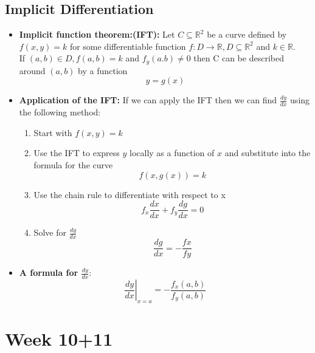 \documentclass{article}
\begin{document}
  \subsection*{Implicit Differentiation}
  \begin{itemize}
    \item \textbf{Implicit function theorem:(IFT):} Let $C \subseteq \mathbb{R}^2$ be a curve defined by $f(x,y) = k$ for some differentiable function $f: D \rightarrow \mathbb{R}, D \subseteq \mathbb{R}^2$ and $k \in \mathbb{R}$.\\
    If $(a,b) \in D, f(a,b) = k$ and $f_y(a.b) \neq 0$ then C can be described around $(a,b)$ by a function
    $$
      y = g(x)
    $$

    \item \textbf{Application of the IFT:} If we can apply the IFT then we can find $\frac{dy}{dx}$ using the following method:
      \begin{enumerate}
        \item Start with $f(x,y) = k$
        \item Use the IFT to express $y$ locally as a function of $x$ and substitute into the formula for the curve
        $$
          f(x,g(x)) = k
        $$
        \item Use the chain rule to differentiate with respect to x
        $$
          f_x\frac{dx}{dx} + f_y\frac{dg}{dx} = 0
        $$
        \item Solve for $\frac{dg}{dx}$
        $$
          \frac{dg}{dx} = -\frac{fx}{fy}
        $$
      \end{enumerate}

      \item \textbf{A formula for $\frac{dy}{dx}$}:
        $$
          \left. \frac{dy}{dx} \right|_{x=a} = - \frac{f_x(a, b)}{f_y(a, b)}
        $$
  \end{itemize}

  \section*{Week 10+11}
  \newcommand{\unitv}[1]{\hat{\underset{\sim}{#1}}}
  \newcommand{\vect}[1]{\underset{\sim}{#1}}
  \newcommand{\DEF}{\textbf{Definition:\ }}
  \newcommand{\len}[1]{||#1||}
\end{document}
